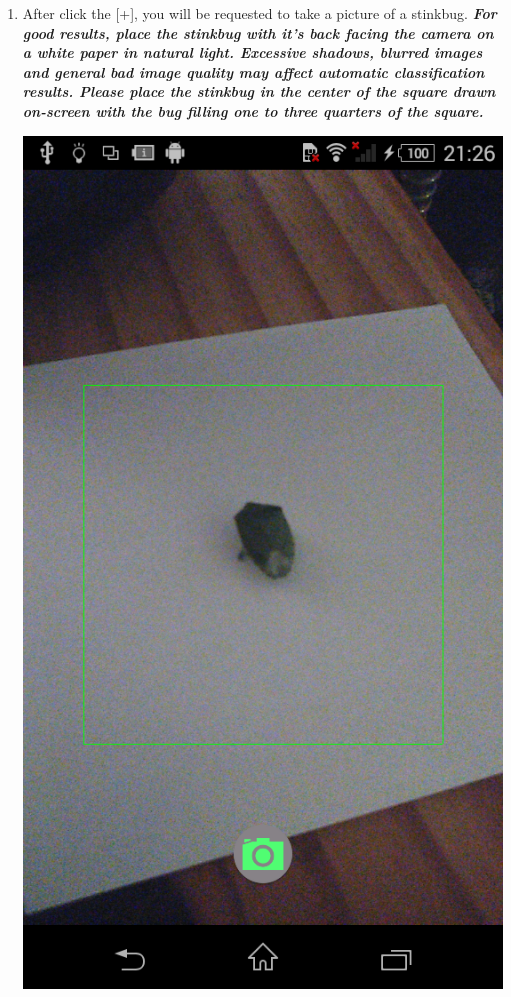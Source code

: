 \documentclass[11pt,a4paper,titlepage]{article}
\begin{document}
\begin{enumerate}
\item After click the [+], you will be requested to take a picture of a stinkbug. \textbf{\textit{For good results, place the stinkbug with it's back facing the camera on a white paper in natural light. Excessive shadows, blurred images and general bad image quality may affect automatic classification results. Please place the stinkbug in the center of the square drawn on-screen with the bug filling one to three quarters of the square.}}
	\begin{center}
				\includegraphics[scale=0.3]{captureimage}
	\end{center}



\end{enumerate}
\end{document}
